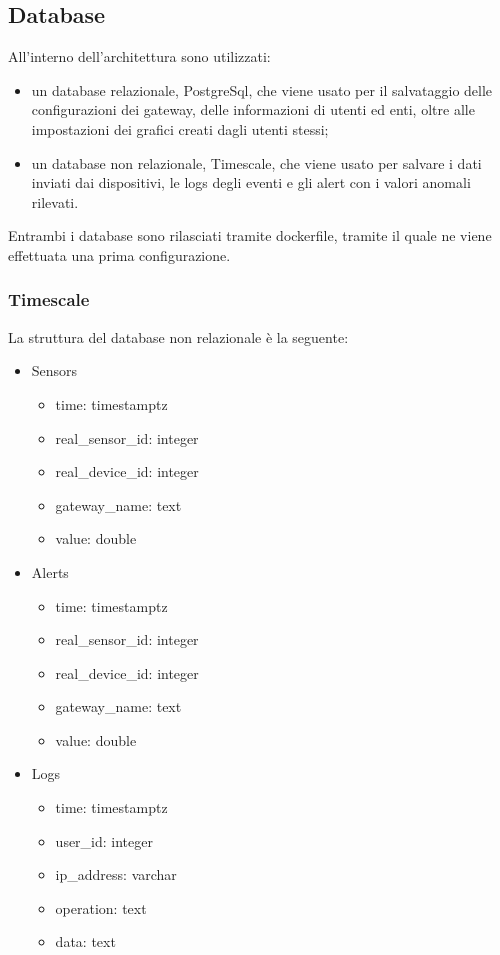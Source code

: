 \subsection{Database}
	All'interno dell'architettura sono utilizzati:
	\begin{itemize}
		\item un database relazionale, PostgreSql, che viene usato per il salvataggio delle configurazioni dei gateway, delle informazioni di utenti ed enti, oltre alle impostazioni dei grafici creati dagli utenti stessi;
		\item un database non relazionale, Timescale, che viene usato per salvare i dati inviati dai dispositivi, le logs degli eventi e gli alert con i valori anomali rilevati. 
	\end{itemize}
	Entrambi i database sono rilasciati tramite dockerfile, tramite il quale ne viene effettuata una prima configurazione.
	\subsubsection{Timescale}
	La struttura del database non relazionale è la seguente:
	\begin{itemize}
		\item Sensors
		\begin{itemize}
			\item time: timestamptz
			\item real\_sensor\_id: integer
			\item real\_device\_id: integer
			\item gateway\_name: text
			\item value: double
		\end{itemize}
		\item Alerts
		\begin{itemize}
			\item time: timestamptz
			\item real\_sensor\_id: integer
			\item real\_device\_id: integer
			\item gateway\_name: text
			\item value: double
		\end{itemize}
		\item Logs
		\begin{itemize}
			\item time: timestamptz
			\item user\_id: integer
			\item ip\_address: varchar
			\item operation: text
			\item data: text
		\end{itemize}
	\end{itemize}

